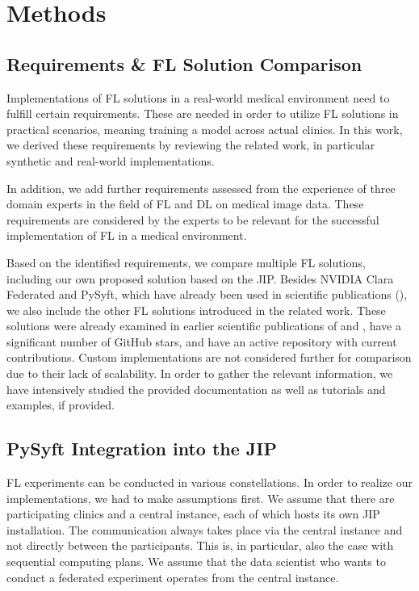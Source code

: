 \section{Methods}
\label{sec:Methods}

\subsection{Requirements \& FL Solution Comparison}
\label{subsec:MethodsRequirements}

Implementations of FL solutions in a real-world medical environment need to fulfill certain requirements. These are needed in order to utilize FL solutions in practical scenarios, meaning training a model across actual clinics. In this work, we derived these requirements by reviewing the related work, in particular synthetic and real-world implementations.

In addition, we add further requirements assessed from the experience of three domain experts in the field of FL and DL on medical image data. These requirements are considered by the experts to be relevant for the successful implementation of FL in a medical environment.

Based on the identified requirements, we compare multiple FL solutions, including our own proposed solution based on the JIP. Besides NVIDIA Clara Federated and PySyft, which have already been used in scientific publications (), we also include the other FL solutions introduced in the related work. These solutions were already examined in earlier scientific publications of \cite{Li2019AProtection} and \cite{He2020FedML:Learning}, have a significant number of GitHub stars, and have an active repository with current contributions. Custom implementations are not considered further for comparison due to their lack of scalability. In order to gather the relevant information, we have intensively studied the provided documentation as well as tutorials and examples, if provided.



\subsection{PySyft Integration into the JIP}
\label{subsec:MethodsPySyftIntegration}
FL experiments can be conducted in various constellations. In order to realize our implementations, we had to make assumptions first.
We assume that there are participating clinics and a central instance, each of which hosts its own JIP installation. The communication always takes place via the central instance and not directly between the participants. This is, in particular, also the case with sequential computing plans.
We assume that the data scientist who wants to conduct a federated experiment operates from the central instance.

